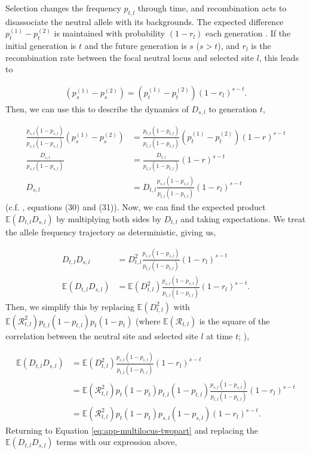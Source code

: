 \documentclass[11pt]{article}
\newcommand{\E}{\mathbb{E}}
\begin{document}
Selection changes the frequency $p_{t,l}$ through time, and recombination acts
to disassociate the neutral allele with its backgrounds. The expected
difference $p^{(1)}_{t} - p^{(2)}_{t}$ is maintained with probability
$(1-r_{l})$ each generation \parencite{Barton2000-zg}. If the initial
generation is $t$ and the future generation is $s$ ($s > t$), and $r_{l}$ is
the recombination rate between the focal neutral locus and selected site $l$,
this leads to

\begin{align}
  ( p^{(1)}_{s} - p^{(2)}_{s} ) = ( p^{(1)}_{t} - p^{(2)}_{t} ) (1-r_{l})^{s-t}.
\end{align}
%
Then, we can use this to describe the dynamics of $D_{s,l}$ to generation $t$,

\begin{align}
  \frac{p_{s,l} (1-p_{s,l})}{p_{s,l} (1-p_{s,l})}( p_{s}^{(1)} - p_{s}^{(2)} ) &= \frac{p_{t,l} (1-p_{t,l})}{p_{t,l} (1-p_{t,l})}( p_{t}^{(1)} - p_{t}^{(2)} ) (1-r)^{s-t} \nonumber \\
  \frac{D_{s,l}}{p_{s,l} (1-p_{s,l})} &= \frac{D_{t,l}}{p_{t,l} (1-p_{t,l})} (1-r)^{s-t} \nonumber \\
  D_{s,l} &= D_{t,l}\frac{ p_{s,l} (1-p_{s,l})}{p_{t,l} (1-p_{t,l})} (1-r_{l})^{s-t}
  \label{eq:ld-dyn}
\end{align}
%
(c.f. \cite{Stephan2006-xz}, equations (30) and (31)). Now, we can find the
expected product $\E(D_{t,l} D_{s,l})$ by multiplying both sides by $D_{t,l}$
and taking expectations. We treat the allele frequency trajectory as
deterministic, giving us,

\begin{align}
  D_{t,l} D_{s,l} &= D_{t,l}^2\frac{ p_{s,l} (1-p_{s,l})}{p_{t,l} (1-p_{t,l})} (1-r_{l})^{s-t} \nonumber \\
  \E(D_{t,l} D_{s,l}) &= \E(D_{t,l}^2)\frac{ p_{s,l} (1-p_{s,l})}{p_{t,l} (1-p_{t,l})} (1-r_{l})^{s-t}.
\end{align}
%
Then, we simplify this by replacing $\E(D_{t,l}^2)$ with
$\E(\mathcal{R}_{t,l}^2) p_{t,l}(1-p_{t,l}) p_{t}(1-p_{t})$ (where
$\E(\mathcal{R}_{t,l})$ is the square of the correlation between the neutral
site and selected site $l$ at time $t$; \cite{Hill1968-ue}),

\begin{align}
  \E(D_{t,l} D_{s,l}) &= \E(D_{t,l}^2)\frac{ p_{s,l} (1-p_{s,l})}{p_{t,l} (1-p_{t,l})} (1-r_{l})^{s-t} \nonumber \\
                      &= \E(\mathcal{R}_{t,l}^2) p_{t} (1-p_{t}) p_{t,l} (1-p_{t,l}) \frac{ p_{s,l} (1-p_{s,l})}{p_{t,l} (1-p_{t,l})} (1-r_{l})^{s-t} \nonumber \\
                      &= \E(\mathcal{R}_{t,l}^2) p_{t} (1-p_{t}) p_{s,l} (1-p_{s,l}) (1-r_{l})^{s-t}.
\end{align}
%
Returning to Equation \eqref{eq:app-multilocus-twopart} and replacing the
$\E(D_{t,l} D_{s,l})$ terms with our expression above, 
\end{document}
